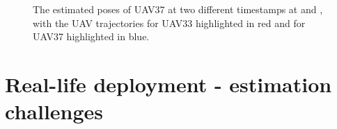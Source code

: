 \begin{figure}[H]
    \centering
    \caption{
        The estimated poses of UAV37 at two different timestamps at  and , with the \ac{UAV} trajectories for UAV33 highlighted in red and for UAV37 highlighted in blue.
    }
\label{fig:3dp}
\end{figure}

\section{Real-life deployment - estimation challenges}

